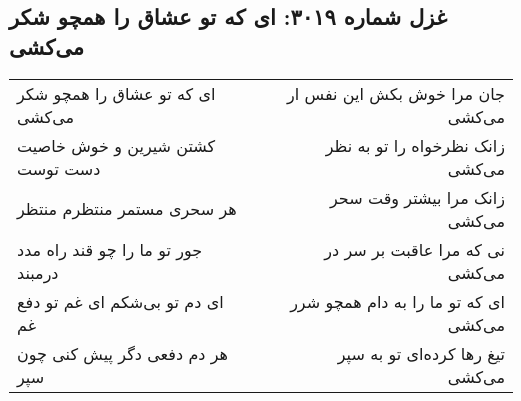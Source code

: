 \begin{center}
\section*{غزل شماره ۳۰۱۹: ای که تو عشاق را همچو شکر می‌کشی}
\label{sec:3019}
\begin{longtable}{l p{0.5cm} r}
ای که تو عشاق را همچو شکر می‌کشی
&&
جان مرا خوش بکش این نفس ار می‌کشی
\\
کشتن شیرین و خوش خاصیت دست توست
&&
زانک نظرخواه را تو به نظر می‌کشی
\\
هر سحری مستمر منتظرم منتظر
&&
زانک مرا بیشتر وقت سحر می‌کشی
\\
جور تو ما را چو قند راه مدد درمبند
&&
نی که مرا عاقبت بر سر در می‌کشی
\\
ای دم تو بی‌شکم ای غم تو دفع غم
&&
ای که تو ما را به دام همچو شرر می‌کشی
\\
هر دم دفعی دگر پیش کنی چون سپر
&&
تیغ رها کرده‌ای تو به سپر می‌کشی
\\
\end{longtable}
\end{center}
